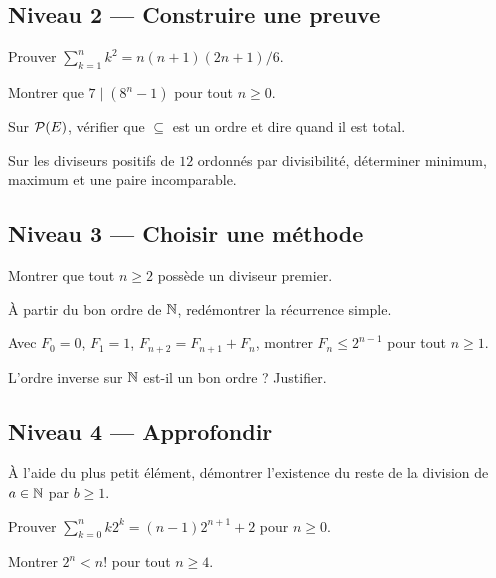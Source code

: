 \subsection*{Niveau 2 — Construire une preuve}
\begin{exercice}\label{ex:rec:5}Prouver $\sum_{k=1}^n k^2=n(n+1)(2n+1)/6$.\end{exercice}
\begin{exercice}[Divisibilité]\label{ex:rec:6}Montrer que $7\mid(8^n-1)$ pour tout $n\ge0$.\end{exercice}
\begin{exercice}\label{ex:rec:7}Sur $\mathcal P(E)$, vérifier que $\subseteq$ est un ordre et dire quand il est total.\end{exercice}
\begin{exercice}\label{ex:rec:8}Sur les diviseurs positifs de $12$ ordonnés par divisibilité, déterminer minimum, maximum et une paire incomparable.\end{exercice}
\subsection*{Niveau 3 — Choisir une méthode}
\begin{exercice}\label{ex:rec:9}Montrer que tout $n\ge2$ possède un diviseur premier.\end{exercice}
\begin{exercice}\label{ex:rec:10}À partir du bon ordre de $\mathbb N$, redémontrer la récurrence simple.\end{exercice}
\begin{exercice}[Fibonacci]\label{ex:rec:11}Avec $F_0=0$, $F_1=1$, $F_{n+2}=F_{n+1}+F_n$, montrer $F_n\le2^{n-1}$ pour tout $n\ge1$.\end{exercice}
\begin{exercice}\label{ex:rec:12}L'ordre inverse sur $\mathbb N$ est-il un bon ordre ? Justifier.\end{exercice}
\subsection*{Niveau 4 — Approfondir}
\begin{exercice}\label{ex:rec:13}À l'aide du plus petit élément, démontrer l'existence du reste de la division de $a\in\mathbb N$ par $b\ge1$.\end{exercice}
\begin{exercice}\label{ex:rec:14}Prouver $\sum_{k=0}^{n}k2^k=(n-1)2^{n+1}+2$ pour $n\ge0$.\end{exercice}
\begin{exercice}\label{ex:rec:15}Montrer $2^n<n!$ pour tout $n\ge4$.\end{exercice}
